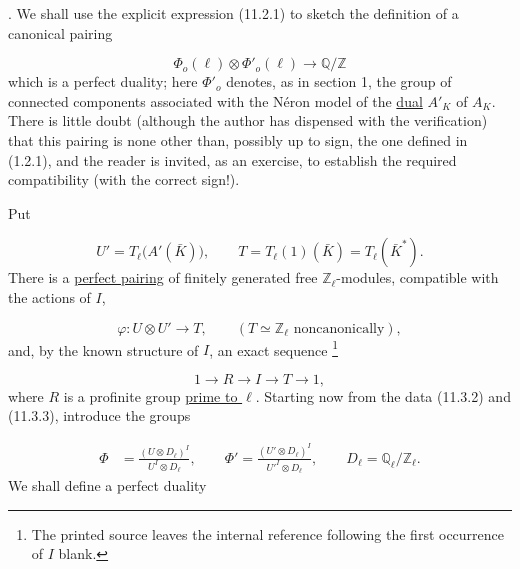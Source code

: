 
\medskip
{}. We shall use the explicit expression (11.2.1) to sketch the
definition of a canonical pairing

\begin{equation}\tag{11.3.1}
\Phi_o(\ell)\otimes\Phi'_o(\ell)\longrightarrow\mathbb Q/\mathbb Z
\end{equation}
which is a perfect duality; here $\Phi'_o$ denotes, as in section 1, the
group of connected components associated with the N\'eron model of the
\underline{dual} $A'_K$ of $A_K$. There is little doubt (although the
author has dispensed with the verification) that this pairing is none
other than, possibly up to sign, the one defined in (1.2.1), and the
reader is invited, as an exercise, to establish the required
compatibility (with the correct sign!).

Put

\begin{equation*}
U'=T_\ell\bigl(A'(\bar K)\bigr),
 \qquad
T=T_\ell(1)(\bar K)=T_\ell(\bar K^*).
\end{equation*}
There is a \underline{perfect pairing} of finitely generated free
$\mathbb Z_\ell$-modules, compatible with the actions of $I$,

\begin{equation}\tag{11.3.2}
\varphi:U\otimes U'\longrightarrow T,
 \qquad (T\simeq\mathbb Z_\ell\text{ noncanonically}),
\end{equation}
and, by the known structure of $I$, an exact sequence
\footnote{The printed source leaves the internal reference following
the first occurrence of $I$ blank.}

\begin{equation}\tag{11.3.3}
1\longrightarrow R\longrightarrow I\longrightarrow T\longrightarrow1,
\end{equation}
where $R$ is a profinite group \underline{prime to $\ell$}. Starting now
from the data (11.3.2) and (11.3.3), introduce the groups

\begin{equation}\tag{11.3.4}
\begin{aligned}
\Phi&=\frac{(U\otimes D_\ell)^I}{U^I\otimes D_\ell},\qquad
\Phi'=\frac{(U'\otimes D_\ell)^I}{{U'}^I\otimes D_\ell},\qquad
D_\ell=\mathbb Q_\ell/\mathbb Z_\ell.
\end{aligned}
\end{equation}
We shall define a perfect duality


